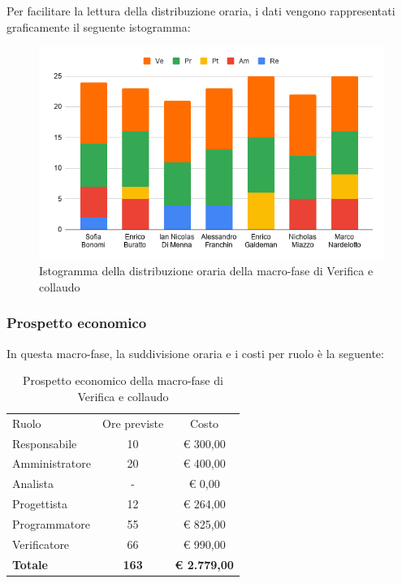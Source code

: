 \documentclass[../piano-di-progetto.tex]{subfiles}
\begin{document}
  Per facilitare la lettura della distribuzione oraria, i dati vengono rappresentati graficamente il seguente istogramma:
  \begin{figure}[H]
    \centering
    \includegraphics[width=12cm]{img/ore-verifica.png}
    \caption{Istogramma della distribuzione oraria della macro-fase di Verifica e collaudo}
    \label{fig:ore-componente-verifica}
  \end{figure}

  \subsubsection{Prospetto economico}
  In questa macro-fase, la suddivisione oraria e i costi per ruolo è la seguente:

  \begin{table}[H]
    \centering
    \begin{tabular}{lcc}
      Ruolo           & Ore previste & Costo               \\
      Responsabile    & 10           & € 300,00            \\
      Amministratore  & 20           & € 400,00            \\
      Analista        & -            & € 0,00              \\
      Progettista     & 12           & € 264,00            \\
      Programmatore   & 55           & € 825,00            \\
      Verificatore    & 66           & € 990,00            \\
      \textbf{Totale} & \textbf{163} & \textbf{€ 2.779,00}
    \end{tabular}
    \caption{Prospetto economico della macro-fase di Verifica e collaudo}
  \end{table}
\end{document}
